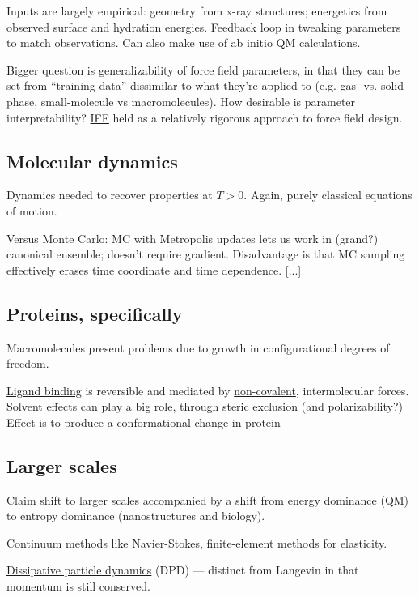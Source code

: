 \documentclass[notitlepage,openany,11pt]{report}
\theoremstyle{plain}%
\numberwithin{equation}{section}
\begin{document}
Inputs are largely empirical: geometry from x-ray structures; energetics from observed surface and hydration energies. Feedback loop in tweaking parameters to match observations.  Can also make use of ab initio QM calculations.

Bigger question is generalizability of force field parameters, in that they can be set from ``training data'' dissimilar to what they're applied to (e.g. gas- vs. solid-phase, small-molecule vs macromolecules). How desirable is parameter interpretability? \href{https://bionanostructures.com/interface-md/}{IFF} held as a relatively rigorous approach to force field design.



\subsection{Molecular dynamics}
Dynamics needed to recover properties at $T>0$. Again, purely classical equations of motion.

Versus Monte Carlo: MC with Metropolis updates lets us work in (grand?) canonical ensemble; doesn't require gradient. Disadvantage is that MC sampling effectively erases time coordinate and time dependence. 
[...]


\subsection{Proteins, specifically}
Macromolecules present problems due to growth in configurational degrees of freedom. 


\href{https://en.wikipedia.org/wiki/Ligand_(biochemistry)}{Ligand binding} is reversible and mediated by \href{https://en.wikipedia.org/wiki/Non-covalent_interaction}{non-covalent}, intermolecular forces. Solvent effects can play a big role, through steric exclusion (and polarizability?) Effect is to produce a conformational change in protein


\subsection{Larger scales}
Claim shift to larger scales accompanied by a shift from energy dominance (QM) to entropy dominance (nanostructures and biology).

Continuum methods like Navier-Stokes, finite-element methods for elasticity. 

\href{https://en.wikipedia.org/wiki/Dissipative_particle_dynamics}{Dissipative particle dynamics} (DPD) --- distinct from Langevin in that momentum is still conserved. 
\end{document}
